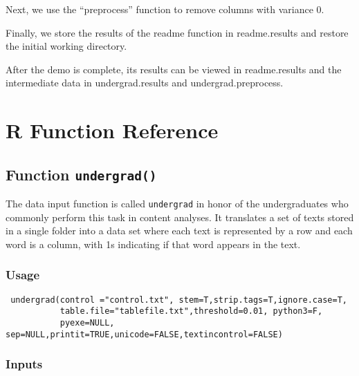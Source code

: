 \documentclass[oneside,letterpaper,titlepage]{article}
\begin{document}
Next, we use the ``preprocess'' function to remove columns with variance 0.

Finally, we store the results of the readme function in readme.results and
restore the initial working directory.

After the demo is complete, its results can be viewed in readme.results and
the intermediate data in undergrad.results and undergrad.preprocess.

\section{R Function Reference}

\subsection{Function \texttt{undergrad()}}
The data input function is called \texttt{undergrad} in honor of the
undergraduates who commonly perform this task in content analyses.  It
translates a set of texts stored in a single folder into a data set
where each text is represented by a row and each word is a column,
with 1s indicating if that word appears in the text.  

\subsubsection{Usage}

\begin{verbatim}
 undergrad(control ="control.txt", stem=T,strip.tags=T,ignore.case=T,
           table.file="tablefile.txt",threshold=0.01, python3=F, 
           pyexe=NULL, sep=NULL,printit=TRUE,unicode=FALSE,textincontrol=FALSE)
\end{verbatim}

\subsubsection{Inputs}
\end{document}
